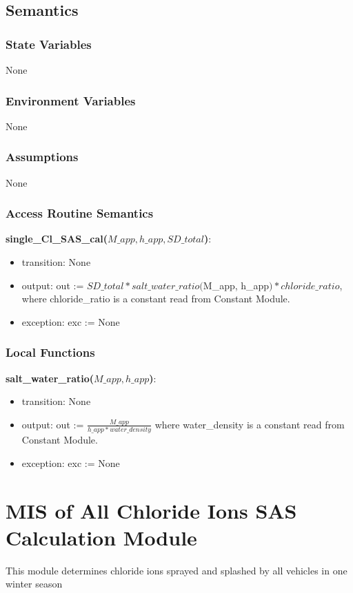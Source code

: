 \documentclass[12pt, titlepage]{article}
\begin{document}
\subsection{Semantics}

\subsubsection{State Variables}
None

\subsubsection{Environment Variables}
None
\subsubsection{Assumptions}
None
\subsubsection{Access Routine Semantics}

\noindent \textbf{single\_Cl\_SAS\_cal($M\_app, h\_app, SD\_total$)}:
\begin{itemize}
\item transition: None
\item output: out := $SD\_total * salt\_water\_ratio($M\_app, h\_app$) * chloride\_ratio$, where chloride\_ratio is a constant read from Constant Module.
\item exception: exc := None
\end{itemize}

\subsubsection{Local Functions}
\noindent \textbf{salt\_water\_ratio($M\_app, h\_app$)}:
\begin{itemize}
\item transition: None
\item output: out := $\frac{M\_app}{h\_app*water\_density}$ where water\_density is a constant read from Constant Module.
\item exception: exc := None
\end{itemize}

\newpage

\section{MIS of All Chloride Ions SAS Calculation Module} \label{allChlorideIonsSASCalculationModule}
This module determines chloride ions sprayed and splashed by all vehicles in one winter season
\end{document}

